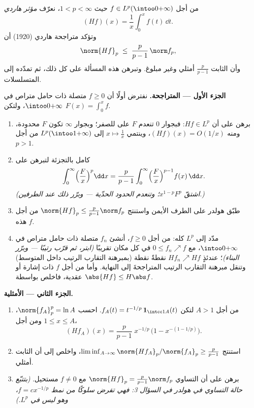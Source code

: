 \begin{problem}\label{pb:b3:lp:1}
من أجل $f \in L^p(\intoo0{+\infty})$ حيث $1 < p < \infty$، نعرّف \emph{مؤثر هاردي}
\[
(Hf)(x) = \frac1x\int_0^x f(t)\,\dd t .
\]
وتؤكد متراجحة هاردي (1920) أن
\[
\norm{Hf}_p \;\leq\; \frac{p}{p-1}\,\norm f_p ,
\]
وأن الثابت $\frac p{p-1}$ أمثلي وغير مبلوغ. وتبرهن هذه المسألة
على كل ذلك، ثم تمدّده إلى المتسلسلات.

\medskip
\noindent\textbf{الجزء الأول --- المتراجحة.} نفترض أولًا أن
$f
\geq 0$ متصلة ذات حامل متراص في $\intoo0{+\infty}$، ولتكن $F(x) = \int_0^xf$.
\begin{enumerate}
  \item برهن على أن $Hf \in L^p$: فبجوار $0$ تنعدم $F$ على
         للصفر؛ وبجوار $\infty$ تكون $F$ محدودة، ومنه
        $(Hf)(x) = O(1/x)$، وينتمي $x \mapsto \frac1x$ إلى $L^p(\intoo1{+\infty})$ من أجل $p > 1$.
  \item كامل بالتجزئة لتبرهن على
        \[
        \int_0^\infty \Bigl(\frac Fx\Bigr)^p\dd x
        = \frac{p}{p-1}\int_0^\infty\Bigl(\frac
        Fx\Bigr)^{p-1}f(x)\,\dd x .
        \]
        \emph{(اشتقّ $x^{1-p}F^p$؛ وتنعدم الحدود الحدّية ---
        وبرّر ذلك عند الطرفين.)}
  \item طبّق هولدر على الطرف الأيمن واستنتج $\norm{Hf}_p \leq \frac p{p-1}\norm f_p$ من أجل
        هذه $f$.
  \item مدّد إلى $L^p$ كله: من أجل $f \geq 0$، أنشئ $f_n$
        متصلة ذات حامل متراص في $\intoo0{+\infty}$، مع $0 \leq f_n \nearrow f$ في كل مكان
        تقريبًا \emph{(ابتر، ثم قرّب رتيبًا --- وبرّر البناء)}؛
        عندئذٍ $Hf_n \nearrow Hf$ نقطةً نقطة (بمبرهنة التقارب الرتيب داخل
        المتوسط) وتنقل مبرهنة التقارب الرتيب المتراجحةَ إلى
        النهاية. وأما من أجل $f$ ذات إشارة أو عقدية، فاخلص
        بواسطة $\abs{Hf} \leq H\abs f$.
\end{enumerate}

\medskip
\noindent\textbf{الجزء الثاني --- الأمثلية.}
\begin{enumerate}[resume]
  \item من أجل $A > 1$ لتكن $f_A(t) = t^{-1/p}\,\mathbf
        1_{\intcc1A}(t)$. احسب $\norm{f_A}_p^p = \ln A$، ومن أجل
        $1 \leq x \leq A$،
        \[
        (Hf_A)(x) = \frac p{p-1}\;x^{-1/p}\,
        \bigl(1 - x^{-(1 - 1/p)}\bigr).
        \]
  \item استنتج $\liminf_{A\to\infty} \norm{Hf_A}_p/
        \norm{f_A}_p \geq \frac{p}{p-1}$، واخلص إلى أن الثابت أمثلي.
  \item برهن على أن التساوي $\norm{Hf}_p = \frac
        p{p-1}\norm f_p$ مع $f \neq 0$ مستحيل.
        \emph{(بتتبّع حالة التساوي في هولدر في السؤال 3: فهي
        تفرض سلوكًا من نمط $f = cx^{-1/p}$، وهو ليس في
        $L^p$.)}
\end{enumerate}


\end{problem}
